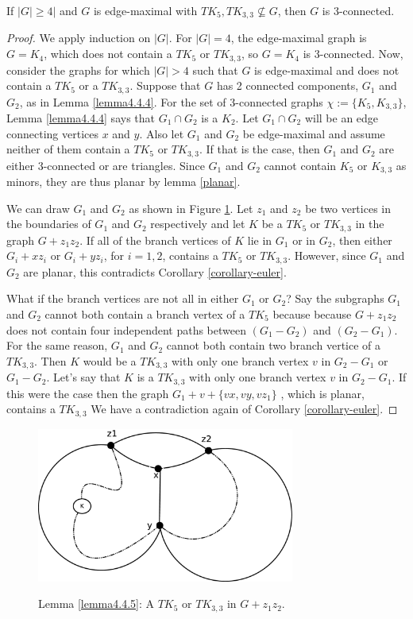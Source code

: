 \begin{lemma}\label{lemma4.4.5}
If $|G| \geq 4|$ and $G$ is edge-maximal with $TK_5, TK_{3,3} \not\subseteq G$, then $G$ is 3-connected.
\end{lemma}
\begin{proof}
We apply induction on $|G|$. For $|G|=4$, the edge-maximal graph is $G=K_4$, which does not contain a $TK_5$ or $TK_{3,3}$, so $G=K_4$ is 3-connected. Now, consider the graphs for which $|G|>4$ such that $G$ is edge-maximal and does not contain a $TK_5$ or a $TK_{3,3}$. Suppose that $G$ has 2 connected components, $G_1$ and $G_2$, as in Lemma \ref{lemma4.4.4}. For the set of 3-connected graphs $\chi:=\{K_5, K_{3,3}\}$, Lemma \ref{lemma4.4.4} says that $G_1 \cap G_2$ is a $K_2$. Let $G_1 \cap G_2$ will be an edge connecting vertices $x$ and $y$. Also let $G_1$ and $G_2$ be edge-maximal and assume neither of them contain a $TK_5$ or $TK_{3,3}$. If that is the case, then $G_1$ and $G_2$ are either 3-connected or are triangles. Since $G_1$ and $G_2$ cannot contain $K_5$ or $K_{3,3}$ as minors, they are thus planar by lemma \ref{planar}. 

We can draw $G_1$ and $G_2$ as shown in Figure \ref{figLemma4.4.5}. Let $z_1$ and $z_2$ be two vertices in the boundaries of $G_1$ and $G_2$ respectively and let $K$ be a $TK_5$ or $TK_{3,3}$ in the graph $G+z_1 z_2$. If all of the branch vertices of $K$ lie in $G_1$ or in $G_2$, then either $G_i + xz_i$ or $G_i + yz_i$, for $i=1,2$, contains a $TK_5$ or $TK_{3,3}$. However, since $G_1$ and $G_2$ are planar, this contradicts Corollary \ref{corollary-euler}. 

What if the branch vertices are not all in either $G_1$ or $G_2$? Say the subgraphs $G_1$ and $G_2$ cannot both contain a branch vertex of a $TK_5$ because because $G+z_1 z_2$ does not contain four independent paths between $(G_1 - G_2)$ and $(G_2 - G_1)$. For the same reason, $G_1$ and $G_2$ cannot both contain two branch vertice of a $TK_{3,3}$. Then $K$ would be a $TK_{3,3}$ with only one branch vertex $v$ in $G_2 - G_1$ or $G_1 - G_2$. Let's say that $K$ is a $TK_{3,3}$ with only one branch vertex $v$ in $G_2 - G_1$. If this were the case then the graph $G_1 + v + \{vx,vy,vz_1\}$ , which is planar, contains a $TK_{3,3}$ We have a contradiction again of Corollary \ref{corollary-euler}.


\end{proof}
\begin{figure}[htbp]
	\centering
	\includegraphics[height=2in]{figLemma4.4.5.eps} \\ 
	\caption{Lemma \ref{lemma4.4.5}: A $TK_5$ or $TK_{3,3}$ in $G + z_1 z_2$.}
\label{figLemma4.4.5}
\end{figure}


